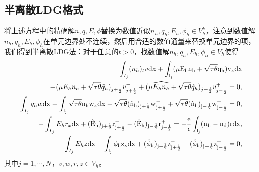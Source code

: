 \subsection{半离散LDG格式}
将上述方程中的精确解$n,q,E,\phi$替换为数值近似$n_h,q_h,E_h,\phi_h \in V_h^k$，注意到数值解$n_h,q_h,E_h,\phi_h$在单元边界处不连续，然后用合适的数值通量来替换单元边界的项，我们得到半离散LDG法：对于任意的$t>0$，找数值解$n_h,q_h,E_h,\phi_h \in V_h$使得
\begin{align}
    \int_{I_j} (n_h)_t v \rm{d}x + \int_{I_j}(\mu E_h n_h + \sqrt{\tau \theta}q_h)v_x\rm{d} x                                                               \nonumber                                                                             \\
    - (\mu E_hn_h + \sqrt{\tau \theta}\hat{q}_h)_{j+\frac{1}{2}}v_{j+\frac{1}{2}}^- +(\mu \widehat{E_hn_h} + \sqrt{\tau \theta}\hat{q}_h)_{j-\frac{1}{2}}v_{j-\frac{1}{2}}^+ = 0,                                   \label{LDG:1:translation}     \\
    \int_{I_j} q_hw \rm{d}x + \int_{I_j}\sqrt{\tau \theta} n_h w_x \rm{d}x - \sqrt{\tau \theta} (\hat{n}_h)_{j+\frac{1}{2}}w_{j+\frac{1}{2}}^- + \sqrt{\tau \theta} (\hat{n}_h)_{j-\frac{1}{2}}w_{j-\frac{1}{2}}^+ = 0, \label{LDG:2:translation} \\
    -\int_{I_j}E_hr_x\rm{d}x + (\hat{E}_h)_{j+\frac{1}{2}}r_{j+\frac{1}{2}}^- - (\hat{E}_h)_{j-\frac{1}{2}}r_{j-\frac{1}{2}}^+ = -\frac{e}{\epsilon}\int_{I_j}(n_h-n_d)r\rm{d}x,                                        \label{LDG:3:translation} \\
    \int_{I_j} E_hz \rm{d}x - \int_{I_j}\phi_h z_x \rm{d}x + (\hat{\phi}_h)_{j+\frac{1}{2}}z_{j+\frac{1}{2}}^- - (\hat{\phi}_h)_{j-\frac{1}{2}}z_{j-\frac{1}{2}}^+ = 0,\label{LDG:4:translation}
\end{align}
其中$ j=1,\cdots,N$，$v,w,r,z \in V_h$。

